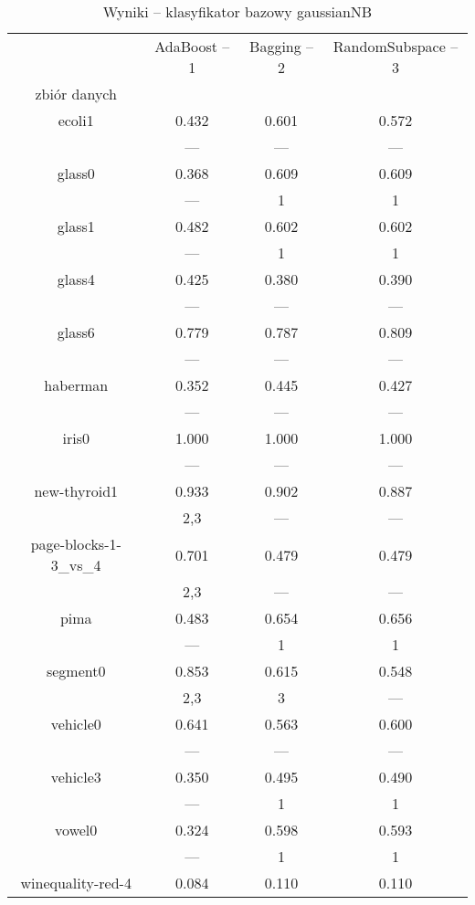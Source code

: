 \documentclass[a4paper,12pt]{article}
\begin{document}
\newpage
\begin{table}[H]
    \begin{center}
    \caption{Wyniki -- klasyfikator bazowy gaussianNB}
    \label{tab:resultsNB}
    \begin{tabular}{|c|c|c|c|}
    \hline
    & AdaBoost -- 1 & Bagging -- 2 & RandomSubspace -- 3 \\
    zbiór danych & & &\\
    \hline
    \hline
    ecoli1 & 0.432  & 0.601 & 0.572 \\
	& --- & --- & --- \\
    \hline
    glass0 & 0.368 & 0.609 & 0.609\\
	& --- & 1 & 1 \\
    \hline
    glass1 & 0.482 & 0.602 & 0.602 \\
	& --- & 1 & 1 \\
    \hline
    glass4 & 0.425 & 0.380 & 0.390 \\
	& --- & --- & --- \\
    \hline
    glass6 & 0.779 & 0.787 & 0.809 \\
	& --- & --- & --- \\
    \hline
    haberman & 0.352 & 0.445 & 0.427 \\
	& --- & --- & ---\\
    \hline
    iris0 & 1.000 & 1.000 & 1.000\\
	& --- & --- & --- \\
    \hline
    new-thyroid1 & 0.933 & 0.902 & 0.887 \\
	& 2,3 & --- & --- \\
    \hline
    page-blocks-1-3\_vs\_4 & 0.701 & 0.479 & 0.479 \\
	& 2,3 & --- & --- \\
    \hline
    pima & 0.483 & 0.654 & 0.656 \\
	& --- & 1 & 1 \\
    \hline
    segment0 & 0.853 & 0.615 & 0.548 \\
	& 2,3 & 3 & --- \\
    \hline
    vehicle0 & 0.641 & 0.563 &  0.600 \\
	& --- & --- & --- \\
    \hline
    vehicle3 & 0.350 & 0.495 & 0.490  \\
	& --- & 1 & 1 \\
    \hline
    vowel0 & 0.324 & 0.598 & 0.593 \\
	& --- & 1 & 1 \\
    \hline
    winequality-red-4 & 0.084 & 0.110 & 0.110 \\

\end{tabular}
\end{center}
\end{table}
\end{document}
